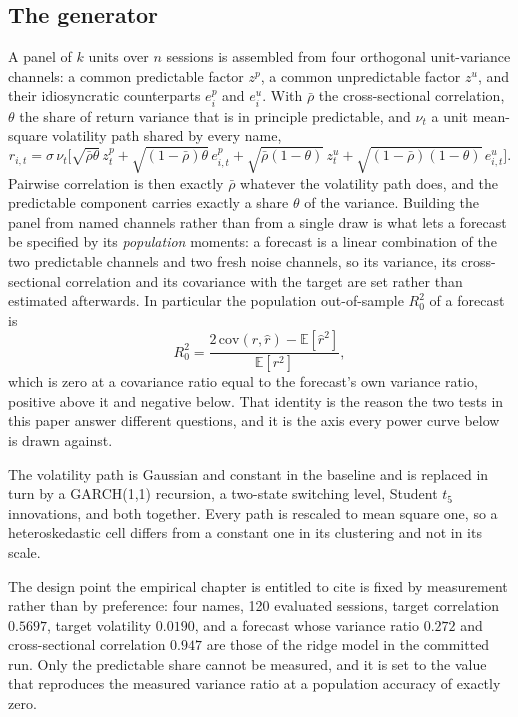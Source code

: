 \documentclass{article}
\theoremstyle{plain}
\theoremstyle{remark}
\begin{document}
\subsection{The generator}

A panel of $k$ units over $n$ sessions is assembled from four orthogonal
unit-variance channels: a common predictable factor $z^{p}$, a common
unpredictable factor $z^{u}$, and their idiosyncratic counterparts $e^{p}_i$ and
$e^{u}_i$. With $\bar\rho$ the cross-sectional correlation, $\theta$ the share
of return variance that is in principle predictable, and $\nu_t$ a unit
mean-square volatility path shared by every name,
\begin{equation}
\label{eq:generator}
r_{i,t} = \sigma\,\nu_t\Big[
\sqrt{\bar\rho\theta}\,z^{p}_t + \sqrt{(1-\bar\rho)\theta}\,e^{p}_{i,t}
+ \sqrt{\bar\rho(1-\theta)}\,z^{u}_t
+ \sqrt{(1-\bar\rho)(1-\theta)}\,e^{u}_{i,t}\Big].
\end{equation}
Pairwise correlation is then exactly $\bar\rho$ whatever the volatility path
does, and the predictable component carries exactly a share $\theta$ of the
variance. Building the panel from named channels rather than from a single draw
is what lets a forecast be specified by its \emph{population} moments: a
forecast is a linear combination of the two predictable channels and two fresh
noise channels, so its variance, its cross-sectional correlation and its
covariance with the target are set rather than estimated afterwards. In
particular the population out-of-sample $R^2_0$ of a forecast is
\begin{equation}
\label{eq:population-r2}
R^2_{0} = \frac{2\,\mathrm{cov}(r,\hat r) - \mathbb{E}[\hat r^2]}{\mathbb{E}[r^2]},
\end{equation}
which is zero at a covariance ratio equal to the forecast's own variance ratio,
positive above it and negative below. That identity is the reason the two tests
in this paper answer different questions, and it is the axis every power curve
below is drawn against.

The volatility path is Gaussian and constant in the baseline and is replaced in
turn by a GARCH(1,1) recursion, a two-state switching level, Student $t_5$
innovations, and both together. Every path is rescaled to mean square one, so a
heteroskedastic cell differs from a constant one in its clustering and not in
its scale.

The design point the empirical chapter is entitled to cite is fixed by
measurement rather than by preference: four names, 120 evaluated sessions,
target correlation $0.5697$, target volatility $0.0190$, and a forecast whose
variance ratio $0.272$ and cross-sectional correlation $0.947$ are those of the
ridge model in the committed run. Only the predictable share cannot be measured,
and it is set to the value that reproduces the measured variance ratio at a
population accuracy of exactly zero.
\end{document}

